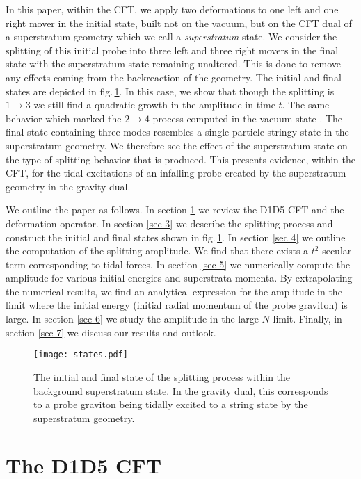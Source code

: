 \documentclass[11pt]{article}
\begin{document}
In this paper, within the CFT, we apply two deformations to one left and one right mover in the initial state, built not on the vacuum, but on the CFT dual of a superstratum geometry which we call a \textit{superstratum} state. We consider the splitting of this initial probe into three left and three right movers in the final state with the superstratum state remaining unaltered. This is done to remove any effects coming from the backreaction of the geometry. The initial and final states are depicted in fig.\,\ref{fig_states}. In this case, we show that though the splitting is $1\to3$ we still find a quadratic growth in the amplitude in time $t$. The same behavior which marked the $2\to4$ process computed in the vacuum state \cite{hm}. The final state containing three modes resembles a single particle stringy state in the superstratum geometry. We therefore see the effect of the superstratum state on the type of splitting behavior that is produced. This presents evidence, within the CFT, for the tidal excitations of an infalling probe created by the superstratum geometry in the gravity dual. 


We outline the paper as follows. In section \ref{sec 2} we review the D1D5 CFT and the deformation operator. In section \ref{sec 3} we describe the splitting process and construct the initial and final states shown in fig.\,\ref{fig_states}. In section \ref{sec 4} we outline the computation of the splitting amplitude. We find that there exists a $t^2$ secular term corresponding to tidal forces. In section \ref{sec 5} we numerically compute the amplitude for various initial energies and superstrata momenta. By extrapolating the numerical results, we find an analytical expression for the amplitude in the limit where the initial energy (initial radial momentum of the probe graviton) is large. In section \ref{sec 6} we study the amplitude in the large $N$ limit. Finally, in section \ref{sec 7} we discuss our results and outlook.
\begin{figure}[!ht]
\centering
        \texttt{[image: states.pdf]}
\caption{The initial and final state of the splitting process within the background superstratum state. In the gravity dual, this corresponds to a probe graviton being tidally excited to a string state by the superstratum geometry.}
\label{fig_states}
\end{figure}


\section{The D1D5 CFT}\label{sec 2}
\end{document}
